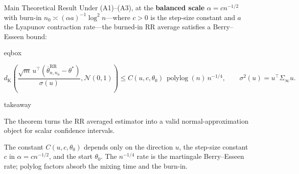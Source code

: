 \documentclass[11pt,aspectratio=169,xcolor=table]{beamer}
\newcommand{\tealaccent}[1]{\textcolor{ThesisTeal}{\bfseries #1}}
\newcommand{\smallgray}[1]{{\scriptsize\color{ThesisGray}#1}}
\newcommand{\RR}{\mathrm{RR}}
\newenvironment{eqbox}
  {\begin{beamercolorbox}[wd=\linewidth,sep=0.48em,center,rounded=true]{eqbox}%
   \begin{minipage}{0.97\linewidth}\centering}
  {\end{minipage}\end{beamercolorbox}}
\newenvironment{takeawaybox}
  {\begin{beamercolorbox}[wd=\linewidth,sep=0.52em,leftskip=0.25em,rightskip=0.25em,rounded=true]{takeaway}%
   \begin{minipage}{0.96\linewidth}%
   \llap{{\color{ThesisGreen}\rule{2.5pt}{2.6ex}}\hspace{0.5em}}}
  {\end{minipage}\end{beamercolorbox}}
\begin{document}
\begin{frame}[shrink=2]{Main Theoretical Result}
\small
Under (A1)--(A3), at the \tealaccent{balanced scale}
$\alpha=cn^{-1/2}$ with burn-in
$n_0\asymp(\alpha a)^{-1}\log^2n$---where $c>0$ is the step-size constant
and $a$ the Lyapunov contraction rate---the burned-in RR average satisfies a
Berry--Esseen bound:

\begin{eqbox}
\[
  d_{\mathrm K}\!\left(
    \frac{\sqrt m\,u^\top
      (\overline\theta_{n,n_0}^\RR-\theta^*)}{\sigma(u)},
    \mathcal N(0,1)\right)
  \leq C(u,c,\theta_0)\,
       \operatorname{polylog}(n)\,n^{-1/4},
  \qquad
  \sigma^2(u)=u^\top\Sigma_\infty u.
\]
\end{eqbox}

\vspace{0.55em}
\begin{takeawaybox}
The theorem turns the RR averaged estimator into a valid
normal-approximation object for scalar confidence intervals.
\end{takeawaybox}

\vspace{0.3em}
\smallgray{The constant $C(u,c,\theta_0)$ depends only on the direction $u$,
the step-size constant $c$ in $\alpha=cn^{-1/2}$, and the start $\theta_0$.
The $n^{-1/4}$ rate is the martingale Berry--Esseen rate; polylog factors
absorb the mixing time and the burn-in.}
\end{frame}
\end{document}
